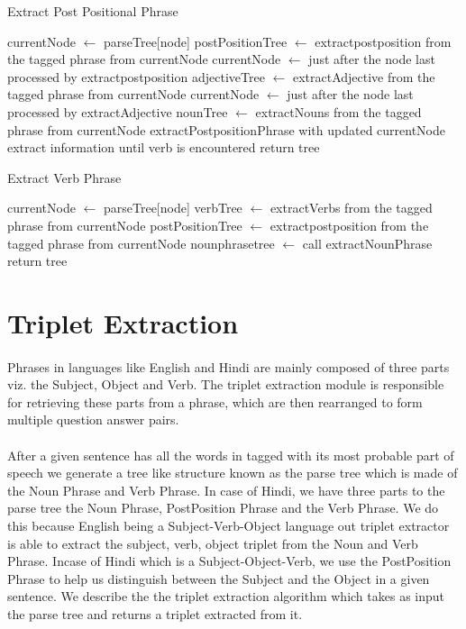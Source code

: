 \begin {algorithm}
\caption {Extract Post Positional Phrase}
\begin {algorithmic}[1]
\State currentNode $\gets$ parseTree[node]
 \State postPositionTree $\gets$ extractpostposition from the tagged phrase from currentNode
\State currentNode $\gets$ just after the node last processed by extractpostposition
\State adjectiveTree $\gets$ extractAdjective from the tagged phrase from currentNode
\State currentNode $\gets$ just after the node last processed by extractAdjective
\State nounTree $\gets$ extractNouns from the tagged phrase from currentNode
\State extractPostpositionPhrase with updated currentNode extract information until verb is encountered
\EndIf
\State return tree
\EndProcedure		
\end {algorithmic}
\end {algorithm}

\begin {algorithm}
\caption {Extract Verb Phrase}
\begin {algorithmic}[1]
\State currentNode $\gets$ parseTree[node]
\State verbTree $\gets$ extractVerbs from the tagged phrase from currentNode
\State postPositionTree $\gets$ extractpostposition from the tagged phrase from currentNode
\State nounphrasetree $\gets$ call extractNounPhrase
\State return tree
\EndProcedure		
\end {algorithmic}
\end {algorithm}

\section{Triplet Extraction}
\paragraph{}
Phrases in languages like English and Hindi are mainly composed of three parts viz. the Subject, Object and Verb. The triplet extraction module is responsible for retrieving these parts from a phrase, which are then rearranged to form multiple question answer pairs.

\paragraph{}
After a given sentence has all the words in tagged with its most probable part of speech we generate a tree like structure known as the parse tree which is made of the Noun Phrase and Verb Phrase. In case of Hindi, we have  three parts to the parse tree the Noun Phrase, PostPosition Phrase and the Verb Phrase. We do this because English being a Subject-Verb-Object language out triplet extractor is able to extract the subject, verb, object triplet from the Noun and Verb Phrase. Incase of Hindi which is a Subject-Object-Verb, we use the PostPosition Phrase to help us distinguish between the Subject and the Object in a given sentence. We describe the the triplet extraction algorithm which takes as input the parse tree and returns a triplet extracted from it.

